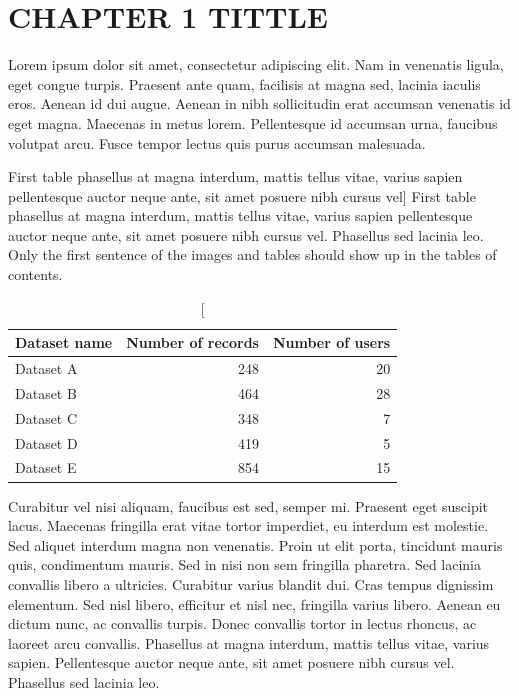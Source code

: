 
\chapter{CHAPTER 1 TITTLE}\label{ch:chapter1}

Lorem ipsum dolor sit amet, consectetur adipiscing elit. Nam in venenatis ligula, eget congue turpis. Praesent ante quam, facilisis at magna sed, lacinia iaculis eros. Aenean id dui augue. Aenean in nibh sollicitudin erat accumsan venenatis id eget magna. Maecenas in metus lorem. Pellentesque id accumsan urna, faucibus volutpat arcu. Fusce tempor lectus quis purus accumsan malesuada.


\begin{table}[ht]
\caption 
[First table phasellus at magna interdum, mattis tellus vitae, varius sapien pellentesque auctor neque ante, sit amet posuere nibh cursus vel]
{First table phasellus at magna interdum, mattis tellus vitae, varius sapien pellentesque auctor neque ante, sit amet posuere nibh cursus vel. Phasellus sed lacinia leo. Only the first sentence of the images and tables should show up in the tables of contents.}
\centering
\fontsize{10}{12}\selectfont
\begin{tabular}{|l|r|r|}
\hline
Dataset name & Number of records  & Number of users \\
\hline 
Dataset A & 248 & 20 \\
\hline
Dataset B & 464 & 28 \\
\hline
Dataset C & 348 & 7 \\
\hline
Dataset D & 419 & 5\\
\hline
Dataset E & 854 & 15\\
\hline
\end{tabular}
\label{tab:table1}
\end{table}


Curabitur vel nisi aliquam, faucibus est sed, semper mi. Praesent eget suscipit lacus. Maecenas fringilla erat vitae tortor imperdiet, eu interdum est molestie. Sed aliquet interdum magna non venenatis. Proin ut elit porta, tincidunt mauris quis, condimentum mauris. Sed in nisi non sem fringilla pharetra. Sed lacinia convallis libero a ultricies. Curabitur varius blandit dui. Cras tempus dignissim elementum. Sed nisl libero, efficitur et nisl nec, fringilla varius libero. Aenean eu dictum nunc, ac convallis turpis. Donec convallis tortor in lectus rhoncus, ac laoreet arcu convallis. Phasellus at magna interdum, mattis tellus vitae, varius sapien. Pellentesque auctor neque ante, sit amet posuere nibh cursus vel. Phasellus sed lacinia leo.


